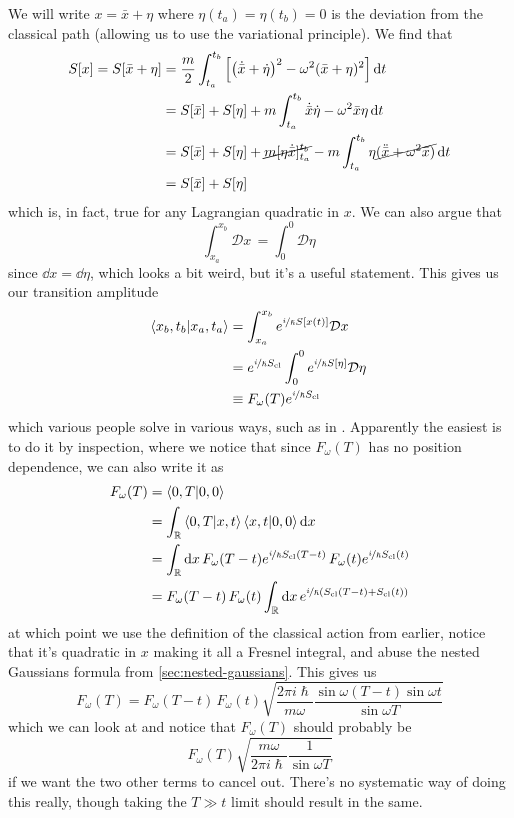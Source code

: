 \documentclass[]{scrreprt}
\renewcommand\hbar\hslash
\newcommand{\DD}[1]{\ensuremath{\mathcal{D} #1\,}}
\begin{document}
We will write \( x = \bar{x} + \eta \) where \(\eta(t_a) = \eta(t_b) = 0\) is the deviation from the classical path (allowing us to use the variational principle).
We find that
\begin{align*}
  S[x] = S[\bar{x} + \eta] &= \frac{m}{2}\int_{t_a}^{t_b} \qty[ \qty(\dot{\bar{x}} + \dot\eta)^2 - \omega^2(\bar{x} + \eta)^2] \dd{t}\\
                    &= S[\bar{x}] + S[\eta] + m\int_{t_a}^{t_b} \dot{\bar{x}}\dot\eta - \omega^2\bar{x}\eta\dd{t}\\
                    &= S[\bar{x}] + S[\eta] + \cancel{m[\eta \dot{\bar{x}}]_{t_a}^{t_b}} - m \int_{t_a}^{t_b}\eta \cancel{(\ddot{\bar{x}} + \omega^2 \bar{x}) }\dd{t}\\
                    &= S[\bar{x}] + S[\eta]
\end{align*}
which is, in fact, true for any Lagrangian quadratic in \(x\).
We can also argue that \[ \int_{x_a}^{x_b} \DD{x} = \int_{0}^{0} \DD{\eta}\] since \(\dd{x} = \dd{\eta} \), which looks a bit weird, but it's a useful statement.
This gives us our transition amplitude
\begin{align*}
  \braket{x_b, t_b}{x_a, t_a} &= \int_{x_a}^{x_b} e^{\nicefrac{i}{\hbar} S[x(t)]} \DD{x}\\
  &= e^{\nicefrac{i}{\hbar} S_{\mathrm{cl}}} \int_{0}^{0} e^{\nicefrac{i}{\hbar} S[\eta]} \DD{\eta}\\
  &\equiv F_\omega(T)e^{\nicefrac{i}{\hbar} S_{\mathrm{cl}}}
\end{align*}
which various people solve in various ways, such as in \cite{feynman2010quantum}. Apparently the easiest is to do it by inspection, where we notice that since \( F_\omega (T) \) has no position dependence, we can also write it as
\begin{align*}
  F_\omega(T) &= \braket{0, T}{0, 0}\\
              &= \int_\mathbb{R} \bra{0,T}\ket{x,t}\bra{x,t}\ket{0,0} \dd{x}\\
              &= \int_\mathbb{R} \dd{x} F_\omega(T - t)e^{\nicefrac{i}{\hbar} S_{\mathrm{cl}}(T-t)}\,F_\omega(t)e^{\nicefrac{i}{\hbar} S_{\mathrm{cl}}(t)}\\
              &= F_\omega(T - t)\, F_\omega(t) \int_\mathbb{R} \dd{x} e^{\nicefrac{i}{\hbar} (S_{\mathrm{cl}}(T-t) + S_{\mathrm{cl}}(t))}
\end{align*}
at which point we use the definition of the classical action from earlier, notice that it's quadratic in \(x \) making it all a Fresnel integral, and abuse the nested Gaussians formula from \autoref{sec:nested-gaussians}.
This gives us
\begin{equation*}
  F_\omega(T) = F_\omega(T - t)\, F_\omega(t) \sqrt{\frac{2\pi i \hbar}{m\omega} \frac{\sin\omega(T-t) \sin\omega t}{\sin \omega T}}
\end{equation*}
which we can look at and notice that \( F_\omega (T) \) should probably be
\[ F_\omega (T) \sqrt{\frac{m\omega}{2\pi i \hbar} \frac{1}{\sin \omega T}} \] if we want the two other terms to cancel out. There's no systematic way of doing this really, though taking the \( T \gg t \) limit should result in the same.
\end{document}
